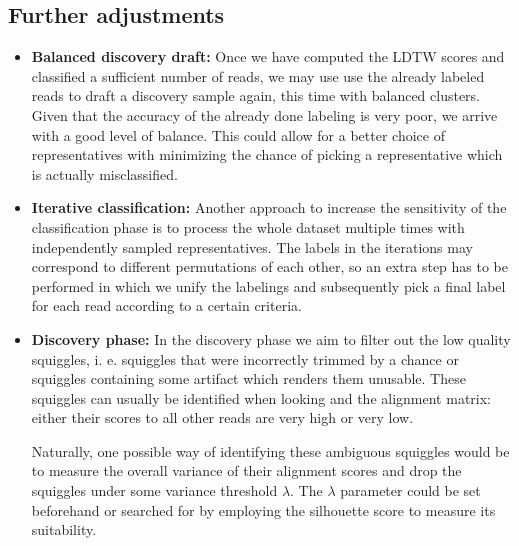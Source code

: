 
\subsection{Further adjustments}
\begin{itemize}
    \item \textbf{Balanced discovery draft:} Once we have computed the LDTW scores and classified a sufficient number of reads, we may use use the already labeled reads to draft a discovery sample again, this time with balanced clusters. Given that the accuracy of the already done labeling is very poor, we arrive with a good level of balance. This could allow for a better choice of representatives with minimizing the chance of picking a representative which is actually misclassified.
    \item \textbf{Iterative classification:} Another approach to increase the sensitivity of the classification phase is to process the whole dataset multiple times with independently sampled representatives. The labels in the iterations may correspond to different permutations of each other, so an extra step has to be performed in which we unify the labelings and subsequently pick a final label for each read according to a certain criteria.
    \item \textbf{Discovery phase:} In the discovery phase we aim to filter out the low quality squiggles, i. e. squiggles that were incorrectly trimmed by a chance or squiggles containing some artifact which renders them unusable. These squiggles can usually be identified when looking and the alignment matrix: either their scores to all other reads are very high or very low.

    Naturally, one possible way of identifying these ambiguous squiggles would be to measure the overall variance of their alignment scores and drop the squiggles under some variance threshold $\lambda$. The $\lambda$ parameter could be set beforehand or searched for by employing the silhouette score to measure its suitability.
\end{itemize}
